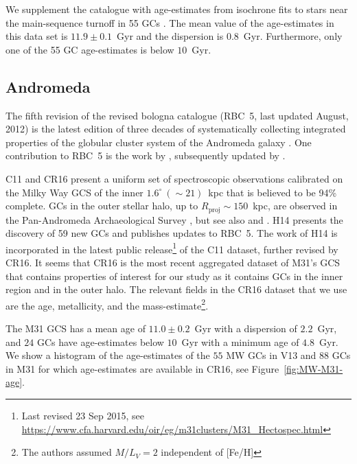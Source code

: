 \documentclass[a4paper,fleqn,usenatbib]{mnras}
\begin{document}
We supplement the catalogue with age-estimates from isochrone fits to stars
near the main-sequence turnoff in 55 GCs \citep[][hereafter V13]{2013ApJ...775..134V}.
The mean value of the age-estimates in this data set is $11.9 \pm 0.1$~Gyr and
the dispersion is $0.8$~Gyr. Furthermore, only one of the 55 GC age-estimates is
below $10$~Gyr.

\subsection{Andromeda}
\label{sec:andromeda}
The fifth revision of the revised bologna catalogue (RBC~5, last updated
August, 2012) is the latest edition of three decades of systematically
collecting integrated properties of the globular cluster system of the
Andromeda galaxy \citep[][and references therein]{2004A&A...416..917G}. One
contribution to RBC~5 is the work by \citet[][hereafter C11]{2011AJ....141...61C},
subsequently updated by \citet[][hereafter CR16]{2016ApJ...824...42C}.

C11 and CR16 present a uniform set of spectroscopic observations calibrated
on the Milky Way GCS of the inner $1.6^\circ~(\sim21)$~kpc that
is believed to be 94\% complete. GCs in the outer stellar halo, up to
$R_{\text{proj}}\sim150$~kpc, are observed in the Pan-Andromeda Archaeological
Survey \citep[PAndAS, ][hereafter H14]{2014MNRAS.442.2165H}, but see also
\citet{2014MNRAS.442.2929V} and \citet{2019MNRAS.484.1756M}. H14 presents the
discovery of 59 new GCs and publishes updates to RBC~5. The work of H14 is
incorporated in the latest public release\footnote{Last revised 23 Sep 2015, see
\url{https://www.cfa.harvard.edu/oir/eg/m31clusters/M31_Hectospec.html}}
of the C11 dataset, further revised by CR16. It seems that CR16 is the most
recent aggregated dataset of M31's GCS that contains properties of interest
for our study as it contains GCs in the inner region and in the outer halo. The
relevant fields in the CR16 dataset that we use are the age, metallicity, and the
mass-estimate\footnote{The authors assumed $M/L_V = 2$ independent of [Fe/H]}.

The M31 GCS has a mean age of $11.0 \pm 0.2$~Gyr with a dispersion of $2.2$~Gyr,
and $24$ GCs have age-estimates below $10$~Gyr with a minimum age of $4.8$~Gyr. 
We show a histogram of the age-estimates of the $55$ MW GCs in V13 and $88$ GCs
in M31 for which age-estimates are available in CR16, see Figure~\ref{fig:MW-M31-age}.
\end{document}
